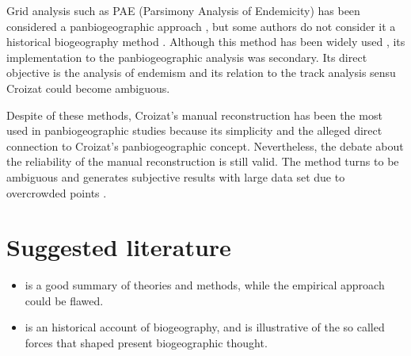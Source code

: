 Grid analysis such as PAE (Parsimony Analysis of Endemicity) has been
considered a panbiogeographic approach \citep{Crawetal1999, Luna-vegaetal2000,
MorroneMarquez2001, Morrone2004c}, but some authors do not consider it a
historical biogeography method \citep{Humphries2000, Garcia-Barros2002, pae2008}.
Although this method has been widely used \citep{Luna-vegaetal2000,
MorroneMarquez2001, Huidobroetal2006, Mihocetal2006, Espinosa-Perezetal2009,
Contreras-Medinaetal2007}, its implementation to the panbiogeographic analysis
was secondary. Its direct objective is the analysis of endemism and its relation
to the track analysis sensu Croizat could become ambiguous.

Despite of these methods, Croizat's manual reconstruction has been the most used
in panbiogeographic studies because its simplicity and the alleged direct
connection to Croizat's panbiogeographic concept. Nevertheless, the debate about
the reliability of the manual reconstruction is still
valid. The method turns to be ambiguous and generates subjective results with
large data set due to overcrowded points \citep{Franco-Rosselli2001, Liria2008}.



\section{Suggested literature}

\begin{itemize}
\item \citet{Crawetal1999} is a good summary of theories and methods, while the
empirical approach could be flawed.

\item \citet{Crisci2001} is an historical account of biogeography, and is
illustrative of the so called forces that shaped present biogeographic thought.
\end{itemize}
